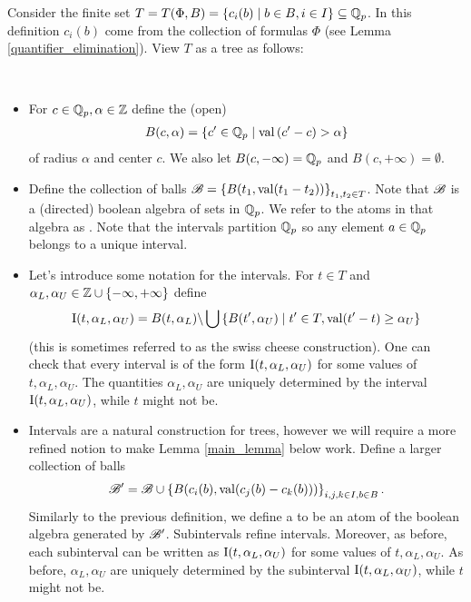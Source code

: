 Consider the finite set $T = T(\Phi, B) = \left\{c_i(b) \mid b \in B, i \in I\right\} \subseteq \mathbb{Q}_p$.
In this definition %
$c_i(b)$ come from the collection of formulas $\Phi$ (see Lemma \ref{quantifier_elimination}).
View $T$ as a tree as follows:
\begin{Definition} \ 
  \begin{itemize}
  \item For $c \in \mathbb{Q}_p, \alpha \in \mathbb{Z}$  define the (open)  
    \begin{align*}
      B(c, \alpha) = \left\{c' \in \mathbb{Q}_p \mid \operatorname{val} \left(c' - c\right) > \alpha\right\}
    \end{align*}
    of radius $\alpha$ and center $c$.
    We also let $B(c, -\infty) = \mathbb{Q}_p$ and $B(c, +\infty) = \emptyset$.
  \item Define the collection of balls $\mathscr B = \left\{B(t_1, \operatorname{val}(t_1 - t_2))\right\}_{t_1, t_2 \in T}$.
    Note that $\mathscr B$ is a (directed) boolean algebra of sets in $\mathbb{Q}_p$.
    We refer to the atoms in that algebra as \defn{intervals}.
    Note that the intervals partition $\mathbb{Q}_p$ so any element $a \in \mathbb{Q}_p$ belongs to a unique interval.
  \item Let's introduce some notation for the intervals.
    For $t \in T$ and $\alpha_L, \alpha_U \in \mathbb{Z} \cup \left\{-\infty, +\infty\right\}$ define
    \begin{align*}
      \operatorname{I}(t, \alpha_L, \alpha_U) = B(t, \alpha_L) \backslash \bigcup \left\{B(t', \alpha_U) \mid t' \in T, \operatorname{val}(t' - t) \geq \alpha_U\right\}
    \end{align*}
    (this is sometimes referred to as the swiss cheese construction).
    One can check that every interval is of the form $\operatorname{I}(t, \alpha_L, \alpha_U)$ for some values of $t, \alpha_L, \alpha_U$.
    The quantities $\alpha_L, \alpha_U$ are uniquely determined by the interval $\operatorname{I}(t, \alpha_L, \alpha_U)$,
    while $t$ might not be.
  \item Intervals are a natural construction for trees, however we will require a more refined notion to make Lemma \ref{main_lemma} below work.
    Define a larger collection of balls 
    \begin{align*}
      \mathscr B' = \mathscr B \cup \left\{B(c_i(b), \operatorname{val}(c_j(b) - c_k(b)))\right\}_{i,j,k \in I, b \in B}.  
    \end{align*}
    Similarly to the previous definition, we define a  to be an atom of the boolean algebra generated by $\mathscr B'$.
    Subintervals refine intervals.
    Moreover, as before, each subinterval can be written as $\operatorname{I}(t, \alpha_L, \alpha_U)$ for some values of $t, \alpha_L, \alpha_U$.
    As before, $\alpha_L, \alpha_U$ are uniquely determined by the subinterval $\operatorname{I}(t, \alpha_L, \alpha_U)$,
    while $t$ might not be.
  \end{itemize}
\end{Definition}

